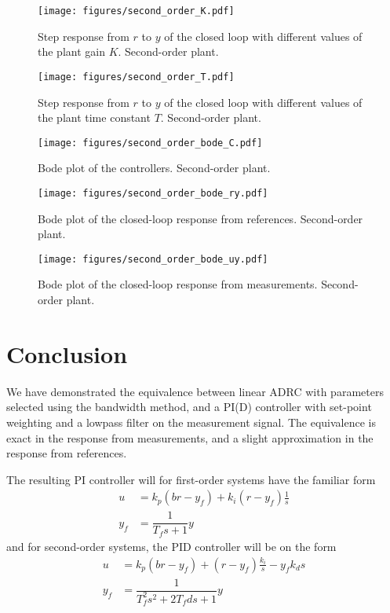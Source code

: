 \documentclass[letterpaper, 10 pt, conference]{ieeeconf}
\begin{document}
\begin{figure}[h]
	\centering
	\texttt{[image: figures/second\_order\_K.pdf]}
	\caption{Step response from $r$ to $y$ of the closed loop with different values of the plant gain $K$. Second-order plant.}
	\label{fig:second_order_K}
\end{figure}
\begin{figure}[h]
	\centering
	\texttt{[image: figures/second\_order\_T.pdf]}
	\caption{Step response from $r$ to $y$ of the closed loop with different values of the plant time constant $T$. Second-order plant.}
	\label{fig:second_order_T}
\end{figure}
\begin{figure}[h]
	\centering
	\texttt{[image: figures/second\_order\_bode\_C.pdf]}
	\caption{Bode plot of the controllers. Second-order plant.}
	\label{fig:second_order_bode_C}
\end{figure}
\begin{figure}[h]
	\centering
	\texttt{[image: figures/second\_order\_bode\_ry.pdf]}
	\caption{Bode plot of the closed-loop response from references. Second-order plant.}
	\label{fig:second_order_bode_ry}
\end{figure}
\begin{figure}[h]
	\centering
	\texttt{[image: figures/second\_order\_bode\_uy.pdf]}
	\caption{Bode plot of the closed-loop response from measurements. Second-order plant.}
	\label{fig:second_order_bode_uy}
\end{figure}

\clearpage
\section{Conclusion}
We have demonstrated the equivalence between linear ADRC with parameters selected using the bandwidth method, and a PI(D) controller with set-point weighting and a lowpass filter on the measurement signal. The equivalence is exact in the response from measurements, and a slight approximation in the response from references. 

The resulting PI controller will for first-order systems have the familiar form
\begin{align}
u &= k_p (br - y_f) + k_i(r-y_f)\frac{1}{s} \\
y_f &= \dfrac{1}{T_f s + 1} y
\end{align}
and for second-order systems, the PID controller will be on the form
\begin{align}
u &= k_p (br - y_f) + (r-y_f)\frac{k_i}{s} - y_fk_d s \\
y_f &= \dfrac{1}{T_f^2s^2 + 2T_f d s + 1} y
\end{align}
\end{document}
